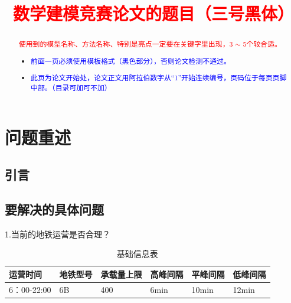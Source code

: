\documentclass[12pt,a4paper]{mcmthesis}
\title{\textcolor{red}{数学建模竞赛论文的题目（三号黑体）}}
\date{}
\begin{document}
    \begin{abstract}
        

        \begin{keywords}
        {\song\xiaosihao
        \textcolor{red}{使用到的模型名称、方法名称、特别是亮点一定要在关键字里出现，3 $\sim$ 5个较合适。}}
        \end{keywords}

        \begin{itemize}
            \item \textcolor{blue}{前面一页必须使用模板格式（黑色部分），否则论文检测不通过。}
            \item \textcolor{blue}{此页为论文开始处，论文正文用阿拉伯数字从“1”开始连续编号，页码位于每页页脚中部。（目录可加可不加）}
        \end{itemize}

    \end{abstract}
    \maketitle
    \renewcommand{\contentsname}{\centerline{\sanhao\bfseries\HEI 目\quad 录}}
    \tableofcontents

    \newpage
    \setcounter{page}{1}


    \section{问题重述}

    \subsection{引言}
    

    \subsection{要解决的具体问题}

    1.当前的地铁运营是否合理？

    \begin{table}
        \centering
        \begin{tabular}{|l|l|l|l|l|l|}
            \hline
            运营时间       & 地铁型号 & 承载量上限 & 高峰间隔 & 平峰间隔  & 低峰间隔  \\ \hline
            6：00-22:00 & 6B   & 400   & 6min & 10min & 12min \\ \hline
        \end{tabular}
        \caption{基础信息表}
        \label{tab:基础信息表}
    \end{table}
\end{document}
